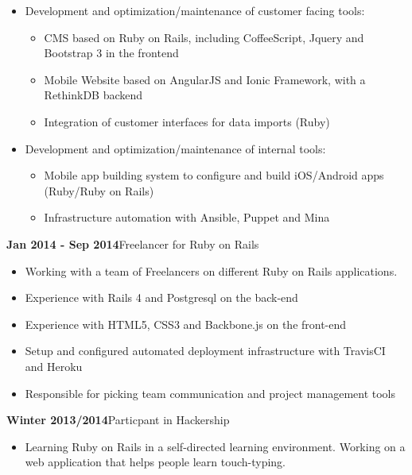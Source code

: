 \documentclass[12pt]{article}
\begin{document}
\begin{itemize}
  \setlength{\itemsep}{0cm}
  \setlength{\parskip}{0cm}

  \item Development and optimization/maintenance of customer facing tools:
  \begin{itemize}
    \setlength{\itemsep}{0cm}
    \setlength{\parskip}{0cm}
    \item CMS based on Ruby on Rails, including CoffeeScript, Jquery and Bootstrap 3 in the frontend
    \item Mobile Website based on AngularJS and Ionic Framework, with a RethinkDB backend
    \item Integration of customer interfaces for data imports (Ruby)
  \end{itemize}

  \item Development and optimization/maintenance of internal tools:
  \begin{itemize}
    \setlength{\itemsep}{0cm}
    \setlength{\parskip}{0cm}
    \item Mobile app building system to configure and build iOS/Android apps (Ruby/Ruby on Rails)
    \item Infrastructure automation with Ansible, Puppet and Mina
  \end{itemize}
\end{itemize}

\textbf{Jan 2014 - Sep 2014}\hfill Freelancer for Ruby on Rails
\begin{itemize}
  \setlength{\itemsep}{0cm}
  \setlength{\parskip}{0cm}

  \item Working with a team of Freelancers on different Ruby on Rails applications.
  \item Experience with Rails 4 and Postgresql on the back-end
  \item Experience with HTML5, CSS3 and Backbone.js on the front-end
  \item Setup and configured automated deployment infrastructure with TravisCI and Heroku
  \item Responsible for picking team communication and project management tools
\end{itemize}

\textbf{Winter 2013/2014}\hfill Particpant in Hackership
\begin{itemize}
  \setlength{\itemsep}{0cm}
  \setlength{\parskip}{0cm}

  \item Learning Ruby on Rails in a self-directed learning environment. Working on a web application that helps people learn touch-typing.
\end{itemize}
\end{document}
